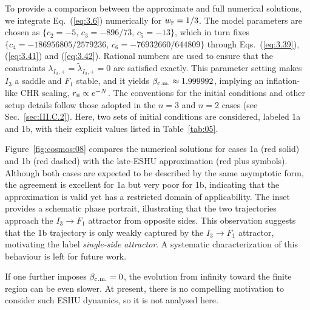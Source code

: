 \documentclass[aps,prd,twocolumn]{revtex4-2}
\newcommand\subcm{{\rm c.m.}}
\newcommand\subF{\textsc{f}}
\newcommand\subH{\textsc{h}}
\begin{document}
To provide a comparison between the approximate and full numerical solutions, we integrate Eq.~(\ref{eq:3.6}) numerically for $w_\subF=1/3$. The model parameters are chosen as $\{c_2=-5,\,c_3=-896/73,\,c_5=-13\}$, which in turn fixes $\{c_4=-186956805/2579236,\,c_6=-76932660/644809\}$ through Eqs.~(\ref{eq:3.39}), (\ref{eq:3.41}) and (\ref{eq:3.42}). Rational numbers are used to ensure that the constraints $\lambda_{I_3,+}=\tilde{\lambda}_{I_3,+}=0$ are satisfied exactly. This parameter setting makes $I_3$ a saddle and $F_1$ stable, and it yields $\beta_\subcm\approx1.999992$, implying an inflation-like CHR scaling, $r_\subH\propto e^{-N}$. The conventions for the initial conditions and other setup details follow those adopted in the $n=3$ and $n=2$ cases (see Sec.~\ref{sec:III.C.2}). Here, two sets of initial conditions are considered, labeled 1a and 1b, with their explicit values listed in Table~\ref{tab:05}.

Figure~\ref{fig:cosmos:08} compares the numerical solutions for cases 1a (red solid) and 1b (red dashed) with the late-ESHU approximation (red plus symbols). Although both cases are expected to be described by the same asymptotic form, the agreement is excellent for 1a but very poor for 1b, indicating that the approximation is valid yet has a restricted domain of applicability. The inset provides a schematic phase portrait, illustrating that the two trajectories approach the $I_3\rightarrow F_1$ attractor from opposite sides. This observation suggests that the 1b trajectory is only weakly captured by the $I_3\rightarrow F_1$ attractor, motivating the label \textit{single-side attractor}. A systematic characterization of this behaviour is left for future work.

If one further imposes $\beta_\subcm=0$, the evolution from infinity toward the finite region can be even slower. At present, there is no compelling motivation to consider such ESHU dynamics, so it is not analysed here.
\end{document}
